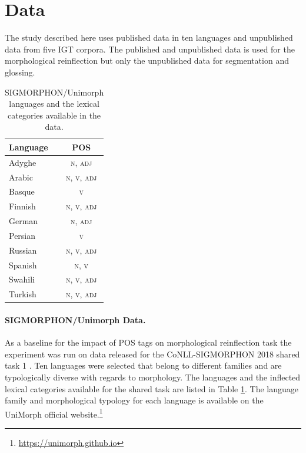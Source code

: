 \section{Data}
\label{sec:data}

The study described here uses published data in ten languages and unpublished data from five IGT corpora. The published and unpublished data is used for the morphological reinflection but only the unpublished data for segmentation and glossing.  


\begin{table}[tb]
    \centering
    \begin{tabular}{lc}
        \textbf{Language} & \textbf{POS} \\
        \hline
        Adyghe  & \textsc{n}, \textsc{adj} \\
        Arabic & \textsc{n}, \textsc{v}, \textsc{adj} \\
        Basque & \textsc{v} \\
        Finnish & \textsc{n}, \textsc{v}, \textsc{adj} \\
        German & \textsc{n}, \textsc{adj} \\
        Persian & \textsc{v} \\
        Russian & \textsc{n}, \textsc{v}, \textsc{adj} \\
        Spanish & \textsc{n}, \textsc{v} \\
        Swahili & \textsc{n}, \textsc{v}, \textsc{adj} \\
        Turkish & \textsc{n}, \textsc{v}, \textsc{adj} \\
    \end{tabular}
    \caption[SIGMORPHON/Unimorph Data]{SIGMORPHON/Unimorph languages and the lexical categories available in the data.}
    \label{tab:SIGPOSdata}
\end{table}

\paragraph{SIGMORPHON/Unimorph Data.}
As a baseline for the impact of POS tags on morphological reinflection task the experiment was run on data released for the CoNLL-SIGMORPHON 2018 shared task 1 \citep{cotterell_conllsigmorphon_2018}. Ten languages were selected that belong to different families and are typologically diverse with regards to morphology. The languages and the inflected lexical categories available for the shared task are listed in Table \ref{tab:SIGPOSdata}. The language family and morphological typology for each language is available on the UniMorph official website.\footnote{\url{https://unimorph.github.io}}  



